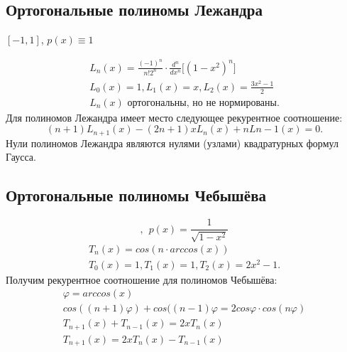 \documentclass[a4paper,11pt]{article}
\begin{document}
\subsection{Ортогональные полиномы Лежандра}
\begin{center}
  $[-1, 1]$, \hspace{5pt} $p(x) \equiv 1$
\end{center}
\begin{gather*}
  \boxed{L_n(x) = \frac{(-1)^n}{n!2^n} \cdot \frac{d^n}{dx^n}\bigg[(1-x^2)^n\bigg]} \\
  L_0(x)=1, L_1(x)=x, L_2(x)=\frac{3x^2-1}{2} \\
  \text{$L_n(x)$ ортогональны, но не нормированы}.
\end{gather*}
Для полиномов Лежандра имеет место следующее рекурентное соотношение:
\begin{equation*}
  (n+1)L_{n+1}(x)-(2n+1)xL_n(x)+nL{n-1}(x)=0.
\end{equation*}
Нули полиномов Лежандра являются нулями (узлами) квадратурных формул Гаусса.

\subsection{Ортогональные полиномы Чебышёва}
\begin{equation*}
  [-1, 1], \hspace{5pt} p(x) = \frac{1}{\sqrt{1-x^2}}
\end{equation*}
\begin{gather*}
  \boxed{T_n(x) = cos(n \cdot arccos(x))} \\
  T_0(x) = 1, T_1(x) = 1, T_2(x) = 2x^2-1.
\end{gather*}
Получим рекурентное соотношение для полиномов Чебышёва:
\begin{gather*}
  \varphi = arccos(x) \\
  cos((n+1)\varphi) + cos((n-1)\varphi = 2cos\varphi \cdot cos(n\varphi) \\
  T_{n+1}(x) + T_{n-1}(x) = 2xT_n(x) \\
  T_{n+1}(x) = 2xT_n(x) - T_{n-1}(x)
\end{gather*}
\end{document}
